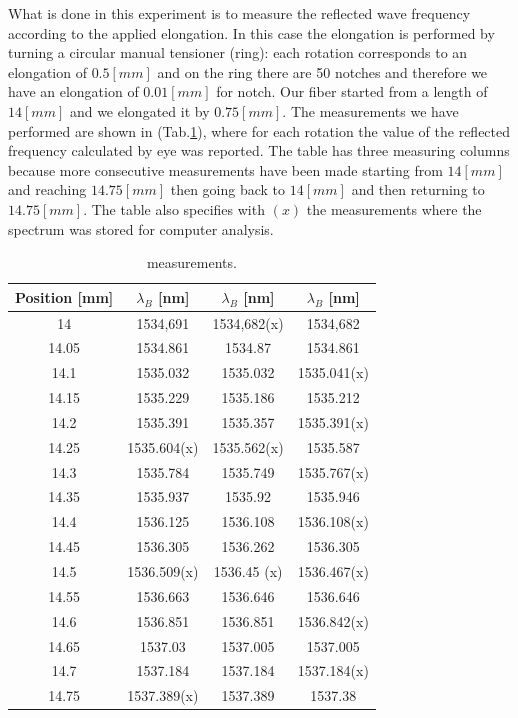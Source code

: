 What is done in this experiment is to measure the reflected wave frequency according to the applied elongation. In this case the elongation is performed by turning a circular manual tensioner (ring): each rotation corresponds to an elongation of $0.5 [mm]$ and on the ring there are 50 notches and therefore we have an elongation of $0.01 [mm]$ for notch. Our fiber started from a length of $14 [mm]$ and we elongated it by $0.75 [mm]$. The measurements we have performed are shown in (Tab.\ref{table:measures}), where for each rotation the value of the reflected frequency calculated by eye was reported. The table has three measuring columns because more consecutive measurements have been made starting from $14 [mm]$ and reaching $14.75 [mm]$ then going back to $14 [mm]$ and then returning to $14.75 [mm]$. The table also specifies with $(x)$ the measurements where the spectrum was stored for computer analysis.
\begin{table}[h]
  \centering
  \begin{tabular}{c|c|c|c}
      Position [mm]  &  $\lambda_B$  [nm]  &  $\lambda_B$  [nm]  &  $\lambda_B$  [nm]  \\
      \hline
      14     &  1534,691     &  1534,682(x)  &  1534,682     \\
      14.05  &  1534.861     &  1534.87      &  1534.861     \\
      14.1   &  1535.032     &  1535.032     &  1535.041(x)  \\
      14.15  &  1535.229     &  1535.186     &  1535.212     \\
      14.2   &  1535.391     &  1535.357     &  1535.391(x)  \\
      14.25  &  1535.604(x)  &  1535.562(x)  &  1535.587     \\
      14.3   &  1535.784     &  1535.749     &  1535.767(x)  \\
      14.35  &  1535.937     &  1535.92      &  1535.946     \\
      14.4   &  1536.125     &  1536.108     &  1536.108(x)  \\
      14.45  &  1536.305     &  1536.262     &  1536.305     \\
      14.5   &  1536.509(x)  &  1536.45 (x)  &  1536.467(x)  \\
      14.55  &  1536.663     &  1536.646     &  1536.646     \\
      14.6   &  1536.851     &  1536.851     &  1536.842(x)  \\
      14.65  &  1537.03      &  1537.005     &  1537.005     \\
      14.7   &  1537.184     &  1537.184     &  1537.184(x)  \\
      14.75  &  1537.389(x)  &  1537.389     &  1537.38      \\

  \end{tabular}
  \caption{measurements.}
  \label{table:measures}
\end{table}
